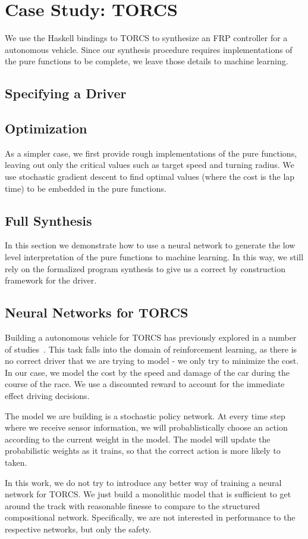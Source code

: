 \section{Case Study: TORCS}

We use the Haskell bindings to TORCS to synthesize an FRP controller for a autonomous vehicle.
Since our synthesis procedure requires implementations of the pure functions to be complete, we leave those details to machine learning.

\subsection{Specifying a Driver}

\subsection{Optimization}
As a simpler case, we first provide rough implementations of the pure functions, leaving out only the critical values such as target speed and turning radius.
We use stochastic gradient descent to find optimal values (where the cost is the lap time) to be embedded in the pure functions.


\subsection{Full Synthesis}
In this section we demonstrate how to use a neural network to generate the low level interpretation of the pure functions to machine learning.
In this way, we still rely on the formalized program synthesis to give us a correct by construction framework for the driver.

\subsection{Neural Networks for TORCS}

Building a autonomous vehicle for TORCS has previously explored in a number of studies~\cite{torcsNN}.
This task falls into the domain of reinforcement learning, as there is no correct driver that we are trying to model - we only try to minimize the cost.
In our case, we model the cost by the speed and damage of the car during the course of the race.
We use a discounted reward to account for the immediate effect driving decisions.

The model we are building is a stochastic policy network.
At every time step where we receive sensor information, we will probablistically choose an action according to the current weight in the model.
The model will update the probabilistic weights as it trains, so that the correct action is more likely to taken.

In this work, we do not try to introduce any better way of training a neural network for TORCS.
We just build a monolithic model that is sufficient to get around the track with reasonable finesse to compare to the structured compositional network.
Specifically, we are not interested in performance to the respective networks, but only the safety.
